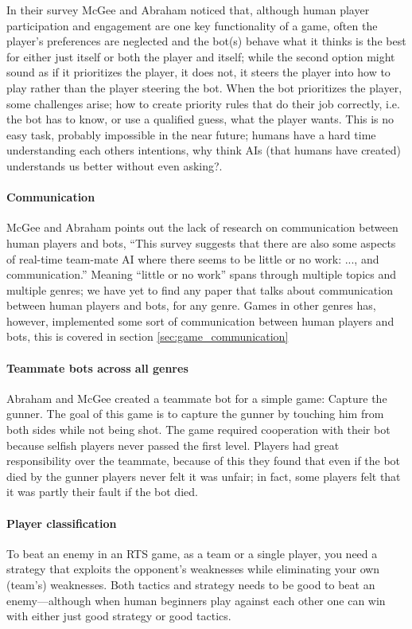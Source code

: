 In their survey\cite{mcgee10} McGee and Abraham noticed that, although human player participation
and engagement are one key functionality of a game\cite{reynolds03}, often the player's preferences
are neglected and the bot(s) behave what it thinks is the best for either just itself or both the
player and itself; while the second option might sound as if it prioritizes the player, it does not,
it steers the player into how to play rather than the player steering the bot. When the bot
prioritizes the player, some challenges arise; how to create priority rules that do their job
correctly\cite{mcgee10}, i.e. the bot has to know, or use a qualified guess, what the player wants.
This is no easy task, probably impossible in the near future; humans have a hard time understanding
each others intentions, why think AIs (that humans have created) understands us
better\cite{norman07} without even asking?.

\paragraph{Communication}
McGee and Abraham points out the lack of research on communication between human players and bots,
“This survey suggests that there are also some aspects of real-time team-mate AI where there seems
to be little or no work: ..., and communication.”\cite{mcgee10} Meaning “little or no work” spans
through multiple topics and multiple genres; we have yet to find any paper that talks about
communication between human players and bots, for any genre. Games in other genres has, however,
implemented some sort of communication between human players and bots, this is covered in section
\ref{sec:game_communication}

\paragraph{Teammate bots across all genres}
Abraham and McGee created a teammate bot for a simple
game: Capture the gunner\cite{abraham10}. The goal of this game is to capture the gunner by touching
him from both sides while not being shot. The game required cooperation with their bot because
selfish players never passed the first level. Players had great responsibility over the teammate,
because of this they found that even if the bot died by the gunner players never felt it was unfair;
in fact, some players felt that it was partly their fault if the bot died.

\paragraph{Player classification}
To beat an enemy in an RTS game, as a team or a single player, you
need a strategy that exploits the opponent's weaknesses while eliminating your own (team’s)
weaknesses. Both tactics and strategy needs to be good to beat an enemy—although when human
beginners play against each other one can win with either just good strategy or good tactics.

